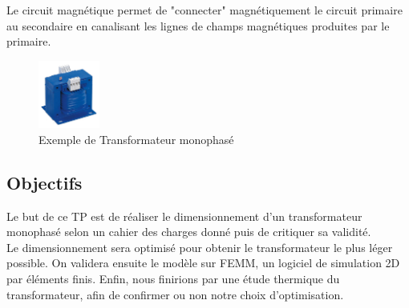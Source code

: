 	Le circuit magnétique permet de "connecter"  magnétiquement le circuit primaire au secondaire en canalisant les lignes de champs magnétiques produites par le primaire.

\begin{figure}[ht]
	\begin{center}
	\includegraphics[width=0.18\textwidth]{images/TP_intro_transfo}
	\caption{Exemple de Transformateur monophasé}\label{img:Transfomono}
	\end{center}
\end{figure}
\FloatBarrier 


\subsection{Objectifs}
Le but de ce TP est de réaliser le dimensionnement d'un transformateur monophasé selon un cahier des charges donné puis de critiquer sa validité.\\
Le dimensionnement sera optimisé pour obtenir le transformateur le plus léger possible. On validera ensuite le modèle sur FEMM, un logiciel de simulation 2D par éléments finis. Enfin, nous finirions par une étude thermique du transformateur, afin de confirmer ou non notre choix d'optimisation.\\